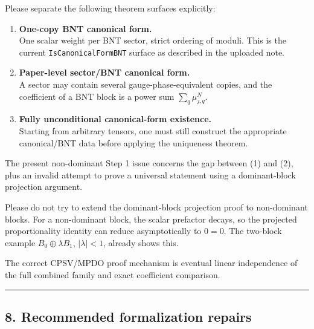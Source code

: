 \documentclass[
  11pt,
]{article}
\begin{document}
Please separate the following theorem surfaces explicitly:

\begin{enumerate}
\def\labelenumi{\arabic{enumi}.}
\item
  \textbf{One-copy BNT canonical form.}\\
  One scalar weight per BNT sector, strict ordering of moduli. This is
  the current \texttt{IsCanonicalFormBNT} surface as described in the
  uploaded note.
\item
  \textbf{Paper-level sector/BNT canonical form.}\\
  A sector may contain several gauge-phase-equivalent copies, and the
  coefficient of a BNT block is a power sum \(\sum_q\mu_{j,q}^N\).
\item
  \textbf{Fully unconditional canonical-form existence.}\\
  Starting from arbitrary tensors, one must still construct the
  appropriate canonical/BNT data before applying the uniqueness theorem.
\end{enumerate}

The present non-dominant Step 1 issue concerns the gap between (1) and
(2), plus an invalid attempt to prove a universal statement using a
dominant-block projection argument.

Please do not try to extend the dominant-block projection proof to
non-dominant blocks. For a non-dominant block, the scalar prefactor
decays, so the projected proportionality identity can reduce
asymptotically to \(0=0\). The two-block example
\(B_0\oplus\lambda B_1\), \(|\lambda|<1\), already shows this.

The correct CPSV/MPDO proof mechanism is eventual linear independence of
the full combined family and exact coefficient comparison.

\begin{center}\rule{0.5\linewidth}{0.5pt}\end{center}

\subsection{8. Recommended formalization
repairs}\label{recommended-formalization-repairs}
\end{document}
